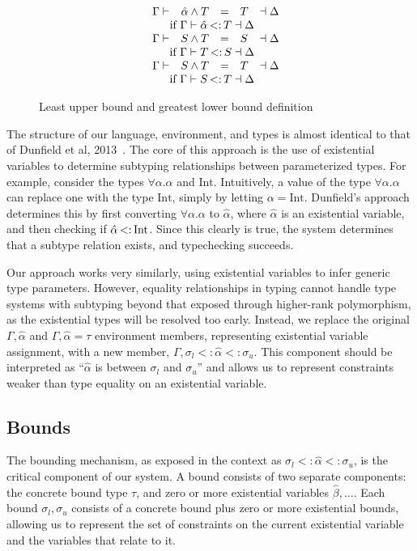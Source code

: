 \documentclass{sig-alternate}
\newcommand{\st}{\ensuremath{\hspace{-1px}<:\hspace{-1px}}}
\newcommand{\alphahat}{\hat{\alpha}}
\newcommand{\botbound}{\sigma_{l}}
\newcommand{\topbound}{\sigma_{u}}
\newcommand{\glb}{\ensuremath{\wedge}}
\newcommand{\tst}{{\scriptstyle{<:}}}
\newcommand{\bound}[3]{#1 \tst #2 \tst #3}
\begin{document}
\begin{figure}
\[\begin{array}{llrcll}
&\Gamma \vdash& \alphahat \glb T &=& T &\dashv \Delta\\
\multicolumn{6}{c}{\text{ if } \Gamma \vdash \alphahat \st T \dashv \Delta}\\
&\Gamma \vdash& S \glb T &=& S &\dashv \Delta \\
\multicolumn{6}{c}{\text{ if } \Gamma \vdash T \st S \dashv \Delta}\\
&\Gamma \vdash& S \glb T &=& T &\dashv \Delta\\
\multicolumn{6}{c}{\text{ if } \Gamma \vdash S \st T \dashv \Delta}\\
\end{array}
\]
\caption{Least upper bound and greatest lower bound definition}
\label{fig:bounds}
\end{figure} 

The structure of our language, environment, and types is almost identical to that of Dunfield et al, 2013~\cite{Dunfield:2013:CEB:2544174.2500582}. The core of this approach is the use of existential variables to determine subtyping relationships between parameterized types. For example, consider the types $\forall \alpha.\alpha$ and $\text{Int}$. Intuitively, a value of the type $\forall\alpha.\alpha$ can replace one with the type $\text{Int}$, simply by letting $\alpha=\text{Int}$. Dunfield's approach determines this by first converting $\forall\alpha.\alpha$ to $\alphahat$, where $\alphahat$ is an existential variable, and then checking if $\alphahat \st \text{Int}$. Since this clearly is true, the system determines that a subtype relation exists, and typechecking succeeds.

Our approach works very similarly, using existential variables to infer generic type parameters. However, equality relationships in typing cannot handle type systems with subtyping beyond that exposed through higher-rank polymorphism, as the existential types will be resolved too early. Instead, we replace the original $\Gamma, \hat{\alpha}$ and $\Gamma, \hat{\alpha}=\tau$ environment members, representing existential variable assignment, with a new member, $\Gamma, \bound{\botbound }{\hat{\alpha}}{\topbound}$. This component should be interpreted as ``$\hat{\alpha}$ is between $\botbound$ and $\topbound$'' and allows us to represent constraints weaker than type equality on an existential variable.

\subsection{Bounds}
The bounding mechanism, as exposed in the context as $\bound{\botbound}{\hat{\alpha}}{\topbound}$, is the critical component of our system. A bound consists of two separate components: the concrete bound type $\tau$, and zero or more existential variables $\hat{\beta}, \ldots$. Each bound $\botbound,\topbound$ consists of a concrete bound plus zero or more existential bounds, allowing us to represent the set of constraints on the current existential variable and the variables that relate to it.
\end{document}
